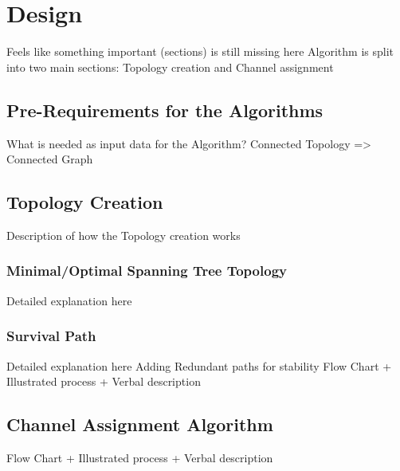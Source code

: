 \chapter{Design}
Feels like something important (sections) is still missing here \newline
Algorithm is split into two main sections: Topology creation and Channel assignment \newline
\section{Pre-Requirements for the Algorithms}
What is needed as input data for the Algorithm?
  Connected Topology => Connected Graph
\section{Topology Creation}
  Description of how the Topology creation works
  \subsection{Minimal/Optimal Spanning Tree Topology}
    Detailed explanation here
  \subsection{Survival Path}
    Detailed explanation here \newline
    Adding Redundant paths for stability \newline
    Flow Chart + Illustrated process + Verbal description \newline
\section{Channel Assignment Algorithm}
  Flow Chart + Illustrated process + Verbal description \cite{caa_tricky}

